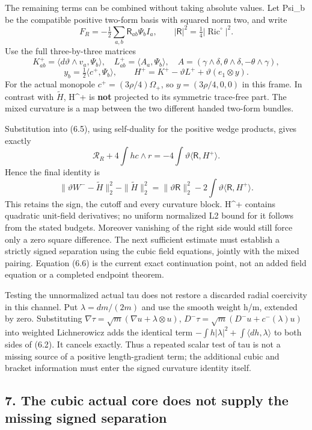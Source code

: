 \documentclass[
  10pt,
]{article}
\begin{document}
The remaining terms can be combined without taking absolute values. Let
Psi\_b be the compatible positive two-form basis with squared norm two,
and write \[
 F_R=-\tfrac12\sum_{a,b}\mathsf R_{ab}\Psi_b I_a,
 \qquad |\mathsf R|^2=\tfrac14|\operatorname{Ric}^{\circ}|^2.
\] Use the full three-by-three matrices \[
 K^+_{ab}=\langle d\vartheta\wedge v_a,\Psi_b\rangle,
 \quad L^+_{ab}=\langle A_a,\Psi_b\rangle,
 \quad A=(\gamma\wedge\delta,\theta\wedge\delta,-\theta\wedge\gamma),
\] \[
 y_b=\tfrac12\langle c^+,\Psi_b\rangle,
 \qquad H^+=K^+-\vartheta L^++\vartheta(e_1\otimes y).
\] For the actual monopole \(c^+=(3\rho/4)\Omega_+\), so
\(y=(3\rho/4,0,0)\) in this frame. In contrast with \(\widetilde H\),
H\^{}+ is \textbf{not} projected to its symmetric trace-free part. The
mixed curvature is a map between the two different handed two-form
bundles.

Substitution into (6.5), using self-duality for the positive wedge
products, gives exactly \[
 \mathcal R_R+4\int h c\wedge r
                         =-4\int\vartheta\langle\mathsf R,H^+\rangle.
\] Hence the final identity is \[
 \boxed{\|\vartheta W^--\widetilde H\|_2^2
                 -\|\widetilde H\|_2^2
       =\|\vartheta\mathsf R\|_2^2
                    -2\int\vartheta\langle\mathsf R,H^+\rangle.} \tag{6.6}
\] This retains the sign, the cutoff and every curvature block. H\^{}+
contains quadratic unit-field derivatives; no uniform normalized L2
bound for it follows from the stated budgets. Moreover vanishing of the
right side would still force only a zero square difference. The next
sufficient estimate must establish a strictly signed separation using
the cubic field equations, jointly with the mixed pairing. Equation
(6.6) is the current exact continuation point, not an added field
equation or a completed endpoint theorem.

Testing the unnormalized actual tau does not restore a discarded radial
coercivity in this channel. Put \(\lambda=dm/(2m)\) and use the smooth
weight h/m, extended by zero. Substituting
\(\nabla\tau=\sqrt m(\nabla u+\lambda\otimes u)\),
\(D^-\tau=\sqrt m(D^-u+c^-(\lambda)u)\) into weighted Lichnerowicz adds
the identical term \(-\int h|\lambda|^2+\int\langle dh,\lambda\rangle\)
to both sides of (6.2). It cancels exactly. Thus a repeated scalar test
of tau is not a missing source of a positive length-gradient term; the
additional cubic and bracket information must enter the signed curvature
identity itself.

\hypertarget{the-cubic-actual-core-does-not-supply-the-missing-signed-separation}{%
\subsection{7. The cubic actual core does not supply the missing signed
separation}\label{the-cubic-actual-core-does-not-supply-the-missing-signed-separation}}
\end{document}
